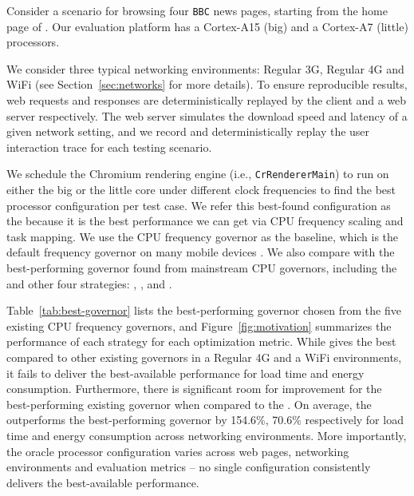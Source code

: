 Consider a scenario for browsing four \texttt{BBC} news pages, starting from the home page of \BBCW. Our evaluation platform has  a
Cortex-A15 (big) and a Cortex-A7 (little) processors.

\vspace{-1mm}
 We consider three typical networking
environments: Regular 3G, Regular 4G and WiFi (see Section~\ref{sec:networks} for more details). To ensure reproducible results, web requests and responses are deterministically replayed by the client and a web server respectively. The
web server simulates the download speed and latency of a given network setting, and we record and deterministically replay the
user interaction trace for each testing scenario.


\vspace{-1mm}
 We schedule the Chromium rendering engine (i.e., \texttt{CrRendererMain}) to run on either the big or the little
core under different clock frequencies to find the best processor configuration per test case. We refer this best-found configuration as
the \Oracle because it is the best performance we can get via CPU frequency scaling and task mapping. We use the \Interactive CPU
frequency governor as the baseline, which is the default frequency governor on many mobile devices \cite{Seo2015Big}. We also compare with the best-performing governor found from mainstream CPU governors,
including
the \Interactive and other four strategies: \Performance, \Conservative, \Ondemand and \Powersave.



 Table~\ref{tab:best-governor} lists the best-performing governor chosen from the five existing CPU
frequency governors, and Figure~\ref{fig:motivation} summarizes the performance of each strategy for each optimization metric. While
\Interactive  gives the best \EDP compared to other existing governors in a Regular 4G and a WiFi environments, it fails to deliver the
best-available performance for load time and energy consumption. Furthermore, there is significant room for improvement for the best-performing
existing governor when compared to the \Oracle.  On average, the \Oracle outperforms the best-performing governor by 154.6\%,
70.6\% respectively for load time and energy consumption across networking environments.
More importantly, the oracle processor configuration varies across web pages, networking
environments and evaluation metrics -- no single configuration consistently delivers the best-available performance.

